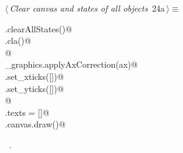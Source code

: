 \documentclass[11.5pt]{report}
\begin{document}

\vspace{-0.8cm}\newchunk 


\begin{flushleft} \small\label{scrap27}\raggedright\small
{} $\langle\,${\itshape Clear canvas and states of all objects}\nobreak\ {\footnotesize {24a}}$\,\rangle\equiv$
\vspace{-1ex}
\begin{list}{}{} \item
\mbox{}\verb@run.clearAllStates()@\\
\mbox{}\verb@ax.cla()@\\
\mbox{}\verb@              @\\
\mbox{}\verb@utils_graphics.applyAxCorrection(ax)@\\
\mbox{}\verb@ax.set_xticks([])@\\
\mbox{}\verb@ax.set_yticks([])@\\
\mbox{}\verb@                 @\\
\mbox{}\verb@fig.texts = []@\\
\mbox{}\verb@fig.canvas.draw()@\\
\mbox{}\verb@@{\NWsep}
\end{list}
\vspace{-1.5ex}
\footnotesize
\begin{list}{}{\setlength{\itemsep}{-\parsep}\setlength{\itemindent}{-\leftmargin}}
\item \NWtxtMacroRefIn\ .

\item{}
\end{list}
\vspace{4ex}
\end{flushleft}
\end{document}
